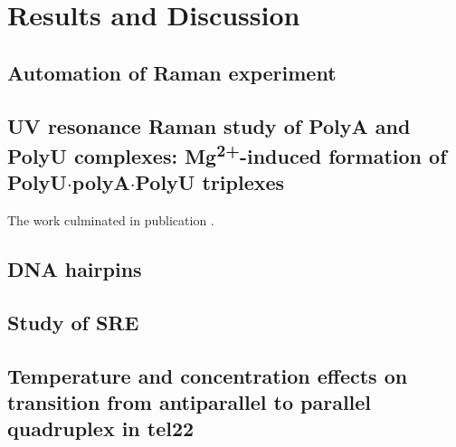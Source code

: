 \chapter{Results and Discussion}



\section{Automation of Raman experiment}






\section[\texorpdfstring{%
    UV resonance Raman study of PolyA and PolyU complexes:\\
		Mg\textsuperscript{2+}\babelhyphen{nobreak}induced formation of
		PolyU$\cdot$polyA$\cdot$PolyU triplexes
}{%
    UV resonance Raman study of PolyA and PolyU complexes:
		Mg\texttwosuperior\textplussuperior-induced formation of PolyU·polyA·PolyU
		triplexes
}]{%
    UV resonance Raman study of PolyA and PolyU complexes:
		Mg\textsuperscript{2+}-induced formation of PolyU$\cdot$polyA$\cdot$PolyU
		triplexes
}%

The work culminated in publication \textcite{Klener2015}.

\section{DNA hairpins}

\section{Study of SRE}

\section[Temperature and concentration effects on transition from antiparallel to parallel quadruplex in tel22]{Temperature and concentration effects on transition from antiparallel to parallel\\ quadruplex in tel22}

